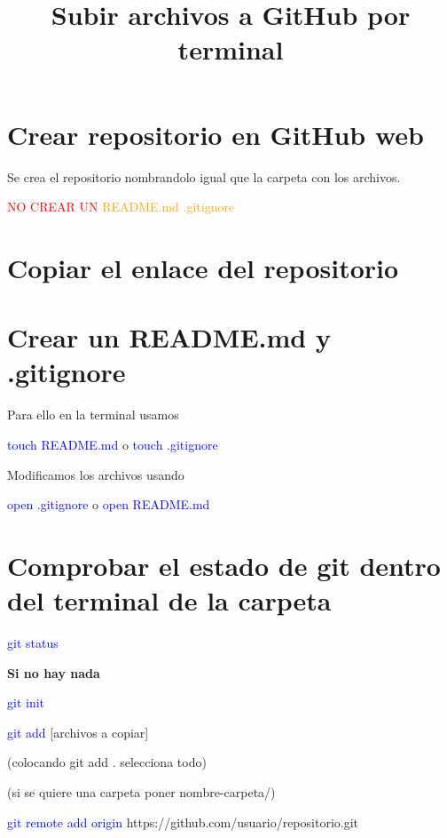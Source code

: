 \documentclass[spanish]{article}
\title{Subir archivos a GitHub por terminal}
\begin{document}
\maketitle


\section{Crear repositorio en GitHub web}

Se crea el repositorio nombrandolo igual que la carpeta con los archivos.

\textcolor{red}{NO CREAR UN} \textcolor{orange}{README.md} \textcolor{orange}{.gitignore} 

\section{Copiar el enlace del repositorio}

\section{Crear un README.md y .gitignore}

Para ello en la terminal usamos

\begin{center}
    \Large\textcolor{blue}{touch README.md} o \Large\textcolor{blue}{touch .gitignore} 
\end{center}

Modificamos los archivos usando

\begin{center}
    \Large\textcolor{blue}{open .gitignore} o \Large\textcolor{blue}{open README.md}  
\end{center}

\section{Comprobar el estado de git dentro del terminal de la carpeta}

\begin{center}
    \Large{\textcolor{blue}{git status}}    
\end{center}

\vspace{3mm}

\textcolor{black!50!red!50!}{\textbf{\large Si no hay nada}}

\begin{center}
    \Large{\textcolor{blue}{git init}}
    
    \Large{\textcolor{blue}{git add} \textcolor{green!20!black!80!}{[archivos a copiar]}}

    \small(colocando \textcolor{white!20!blue!80!}{git add .} selecciona todo)

    \small (si se quiere una carpeta poner \textcolor{green!20!black!80!}{nombre-carpeta/})

    \Large{\textcolor{blue}{git remote add origin} \textcolor{green!20!black!80!}{https://github.com/usuario/repositorio.git}}
\end{center}
\end{document}
